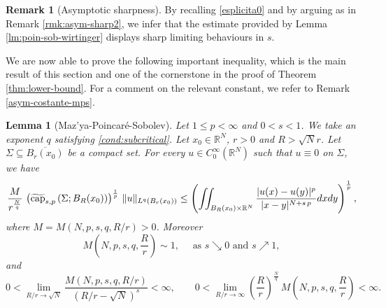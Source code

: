 \documentclass{amsart}
\newtheorem{lemma}[theorem]{Lemma}
\theoremstyle{definition}
\newtheorem{remark}[theorem]{Remark}
\numberwithin{equation}{section}
\begin{document}
\begin{remark}[Asymptotic sharpness]
	By recalling \eqref{esplicita0} and by arguing as in Remark \ref{rmk:asym-sharp2}, we infer that the estimate provided by Lemma \ref{lm:poin-sob-wirtinger} displays sharp limiting behaviours in $s$. 
\end{remark}


We are now able to prove the following important inequality, which is the main result of this section and one of the cornerstone in the proof of Theorem \ref{thm:lower-bound}. For a comment on the relevant constant, we refer to Remark \ref{asym-costante-mps}.  

\begin{lemma}[Maz'ya-Poincar\'e-Sobolev] \label{lm:mazya-poin2}
	Let $1 \le p < \infty$ and $0 < s < 1$. We take an exponent $q$ satisfying \eqref{cond:subcritical}. Let $x_0 \in \mathbb{R}^N$, $r > 0$ and $R > \sqrt{N}r$. Let $\Sigma \subseteq  \overline{B_{r}(x_0)}$ be a compact set. For every $u \in C^\infty_0(\mathbb{R}^N)$ such that $u \equiv 0$ on $\Sigma$, we have 
	\begin{equation*}
		\frac{M}{r^{\frac{N}{q}}}\,\left(\widetilde{\rm cap}_{s,p}\left(\Sigma; B_{R}(x_0)\right)\right)^{\frac{1}{p}} \,\|u\|_{L^q(B_r(x_0))} \le \left(\iint_{B_{R}(x_0) \times \mathbb{R}^N} \frac{|u(x) - u(y)|^p}{|x-y|^{N+s\,p}}dxdy\right)^{\frac{1}{p}},
	\end{equation*}
	where $M=M\left(N, p, s, q, R/r\right) > 0$. Moreover
	\[
	M\left(N, p, s, q, \frac{R}{r}\right) \sim 1, \quad \mbox{ as } s \searrow 0 \mbox{ and } s \nearrow 1,
	\]
	and 
	\[
	0 < \lim_{R/r \to \sqrt{N}} \frac{M\left(N, p, s, q, R/r\right)}{\left(R/r - \sqrt{N}\right)^s} < \infty, \qquad 0 < \lim_{R/r \to \infty}\left(\frac{R}{r}\right)^{\frac{N}{q}}\,M\left(N, p, s, q, \frac{R}{r}\right) < \infty.
	\] 
\end{lemma}
\end{document}
